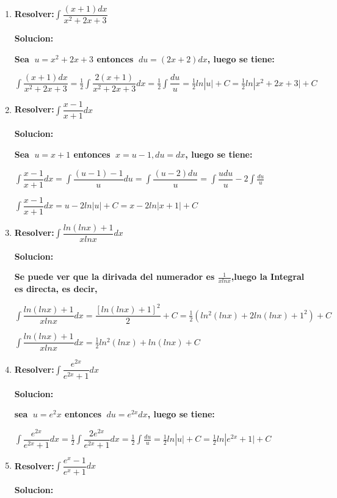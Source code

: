 \documentclass[10pt,a4paper]{book}
\newcommand{\ds}{\displaystyle}
\begin{document}
\begin{enumerate}
    \vspace{0.5cm}
    \item \textbf{Resolver:}$\ds\int\dfrac{(x+1)dx}{x^2+2x+3}$
    
        \textbf{Solucion:}

        \textbf{Sea $\ds\ u=x^2+2x+3$ entonces $\ds\ du=(2x+2)dx$, luego se tiene:}

        $\ds\int\dfrac{(x+1)dx}{x^2+2x+3}=\frac{1}{2}\int\dfrac{2(x+1)}{x^2+2x+3}dx=\frac{1}{2}\int\dfrac{du}{u}
        =\frac{1}{2}ln|u \vert+C=\frac{1}{2}ln|x^2+2x+3 \vert+C$

    \vspace{0.5cm}
    \item \textbf{Resolver:}$\ds\int\dfrac{x-1}{x+1}dx$
    
        \textbf{Solucion:}

        \textbf{Sea $\ds\ u=x+1$ entonces $\ds\ x=u-1,du=dx$, luego se tiene:}

        $\ds\int\dfrac{x-1}{x+1}dx=\int \dfrac{(u-1)-1}{u}du=\int\dfrac{(u-2)du}{u}=\int\dfrac{udu}{u}-2\int\frac{du}{u}$

        $\ds\int\dfrac{x-1}{x+1}dx=u-2ln|u \vert+C=x-2ln|x+1 \vert+C $

    \vspace{0.5cm}
    \item \textbf{Resolver:}$\ds\int\dfrac{ln(lnx)+1}{xlnx}dx$
    
        \textbf{Solucion:}

        \textbf{Se puede ver que la dirivada del numerador es $\ds\frac{1}{xlnx}$,luego la Integral es directa, es decir,}

        $\ds\int\dfrac{ln(lnx)+1}{xlnx}dx=\dfrac{\left[ln(lnx)+1\right]^2}{2}+C=\frac{1}{2}(ln^2(lnx)+2ln(lnx)+1^2)+C$

        $\ds\int\dfrac{ln(lnx)+1}{xlnx}dx=\frac{1}{2}ln^2(lnx)+ln(lnx)+C$

    \vspace{0.5cm}
    \item \textbf{Resolver:}$\ds\int\dfrac{e^{2x}}{e^{2x}+1}dx$
    
        \textbf{Solucion:}

        \textbf{sea $\ds\ u=e^2x$ entonces $\ds\ du=e^{2x}dx$, luego se tiene:}

        $\ds\int\dfrac{e^{2x}}{e^{2x}+1}dx=\frac{1}{2}\int\dfrac{2e^{2x}}{e^{2x}+1}dx=\frac{1}{2}\int\frac{du}{u}=
        \frac{1}{2}ln|u \vert+C=\frac{1}{2}ln|e^{2x}+1 \vert+C $


    \vspace{0.5cm}
    \item \textbf{Resolver:}$\ds\int \dfrac{e^x-1}{e^x+1}dx$
    
        \textbf{Solucion:}

    






\end{enumerate}
\end{document}
